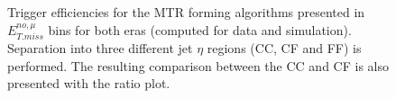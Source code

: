 \begin{figure}[htbp]
{    }
  \caption{Trigger efficiencies for the MTR forming algorithms presented in $E_{T.miss}^{no,\mu}$ bins for both eras (computed for data and simulation). Separation into three different jet $\eta$ regions (CC, CF and FF) is performed. The resulting comparison between the CC and CF is also presented with the ratio plot. }
  \label{fig:metmht_test}
\end{figure}


